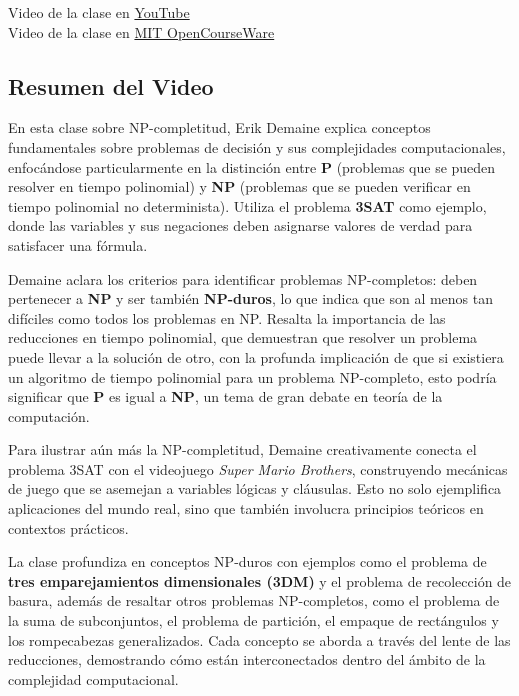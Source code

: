 \documentclass[12pt]{article}
\begin{document}
    Video de la clase en  \href{https://www.youtube.com/watch?v=eHZifpgyH_4&t=66s}{YouTube} \\
    Video de la clase en  \href{https://ocw.mit.edu/courses/6-046j-design-and-analysis-of-algorithms-spring-2015/resources/lecture-16-complexity-p-np-np-completeness-reductions/}{MIT OpenCourseWare}

    \subsection{Resumen del Video}
    En esta clase sobre NP-completitud, Erik Demaine explica conceptos fundamentales sobre problemas de decisión y sus complejidades computacionales, enfocándose particularmente en la distinción entre \textbf{P} (problemas que se pueden resolver en tiempo polinomial) y \textbf{NP} (problemas que se pueden verificar en tiempo polinomial no determinista). Utiliza el problema \textbf{3SAT} como ejemplo, donde las variables y sus negaciones deben asignarse valores de verdad para satisfacer una fórmula.

    Demaine aclara los criterios para identificar problemas NP-completos: deben pertenecer a \textbf{NP} y ser también \textbf{NP-duros}, lo que indica que son al menos tan difíciles como todos los problemas en NP. Resalta la importancia de las reducciones en tiempo polinomial, que demuestran que resolver un problema puede llevar a la solución de otro, con la profunda implicación de que si existiera un algoritmo de tiempo polinomial para un problema NP-completo, esto podría significar que \textbf{P} es igual a \textbf{NP}, un tema de gran debate en teoría de la computación.

    Para ilustrar aún más la NP-completitud, Demaine creativamente conecta el problema 3SAT con el videojuego \textit{Super Mario Brothers}, construyendo mecánicas de juego que se asemejan a variables lógicas y cláusulas. Esto no solo ejemplifica aplicaciones del mundo real, sino que también involucra principios teóricos en contextos prácticos.

    La clase profundiza en conceptos NP-duros con ejemplos como el problema de \textbf{tres emparejamientos dimensionales (3DM)} y el problema de recolección de basura, además de resaltar otros problemas NP-completos, como el problema de la suma de subconjuntos, el problema de partición, el empaque de rectángulos y los rompecabezas generalizados. Cada concepto se aborda a través del lente de las reducciones, demostrando cómo están interconectados dentro del ámbito de la complejidad computacional.
\end{document}
